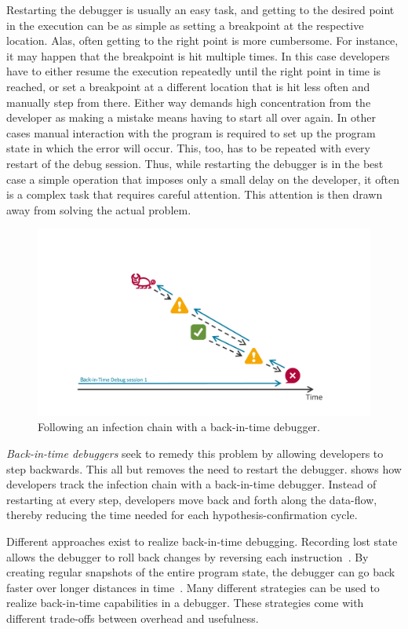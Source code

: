 Restarting the debugger is usually an easy task, and getting to the desired point in the execution can be as simple as setting a breakpoint at the respective location.
Alas, often getting to the right point is more cumbersome.
For instance, it may happen that the breakpoint is hit multiple times.
In this case developers have to either resume the execution repeatedly until the right point in time is reached, or set a breakpoint at a different location that is hit less often and manually step from there.
Either way demands high concentration from the developer as making a mistake means having to start all over again.
In other cases manual interaction with the program is required to set up the program state in which the error will occur.
This, too, has to be repeated with every restart of the debug session.
Thus, while restarting the debugger is in the best case a simple operation that imposes only a small delay on the developer, it often is a complex task that requires careful attention.
This attention is then drawn away from solving the actual problem.

\begin{figure}[t]
\centering
\includegraphics[width=.9\linewidth]{img/workflow-odb}
\caption{Following an infection chain with a back-in-time debugger.}
\label{fig:workflow-odb}
\end{figure}

\emph{Back-in-time debuggers} seek to remedy this problem by allowing developers to step backwards.
This all but removes the need to restart the debugger.
 shows how developers track the infection chain with a back-in-time debugger.
Instead of restarting at every step, developers move back and forth along the data-flow, thereby reducing the time needed for each hypothesis-confirmation cycle.

Different approaches exist to realize back-in-time debugging.
Recording lost state allows the debugger to roll back changes by reversing each instruction~\cite{feldman88:igor_a_system,cook02:reverse_execution_of_java,lieberman95:zstep_95_a_reversible}.
By creating regular snapshots of the entire program state, the debugger can go back faster over longer distances in time~\cite{boothe00:efficient_algorithms_for_bidirectional,tolmach93:a_debugger_for_standard}.
Many different strategies can be used to realize back-in-time capabilities in a debugger.
These strategies come with different trade-offs between overhead and usefulness.

